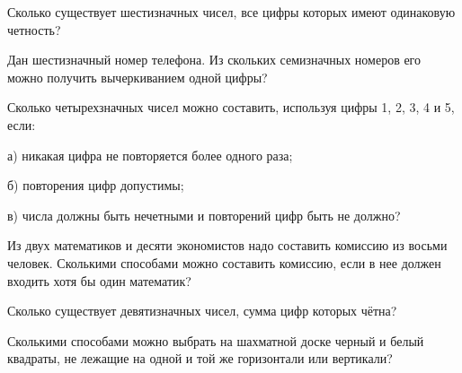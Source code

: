 \begin{problems}
\item Сколько существует шестизначных чисел, все цифры которых имеют одинаковую четность?

\item Дан шестизначный номер телефона. Из скольких семизначных номеров его можно получить вычеркиванием одной цифры? 

\item Сколько четырехзначных чисел можно составить, используя цифры 1, 2, 3, 4 и 5, если:

  а) никакая цифра не повторяется более одного раза;
  
  б) повторения цифр допустимы;
  
  в) числа должны быть нечетными и повторений цифр быть не должно?

\item Из двух математиков и десяти экономистов надо составить комиссию из восьми человек. Сколькими способами можно составить комиссию, если в нее должен входить хотя бы один математик? 





\item Сколько существует девятизначных чисел, сумма цифр которых чётна?

\item Сколькими способами можно выбрать на шахматной доске черный и белый квадраты, не лежащие на одной и той же горизонтали или вертикали?


\end{problems}
